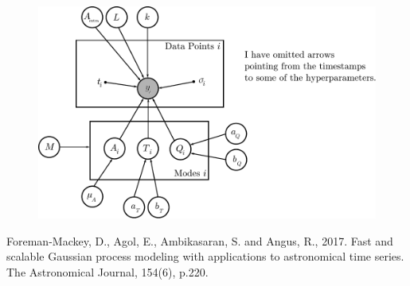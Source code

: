 \documentclass[a4paper, 12pt]{article}
\begin{document}
\begin{figure}[!ht]
\centering
\includegraphics{pgm.pdf}
\caption{\label{fig:pgm}}
\end{figure}

\begin{thebibliography}{999}
Foreman-Mackey, D., Agol, E., Ambikasaran, S. and Angus, R., 2017. Fast and scalable Gaussian process modeling with applications to astronomical time series. The Astronomical Journal, 154(6), p.220.
\end{thebibliography}
\end{document}
